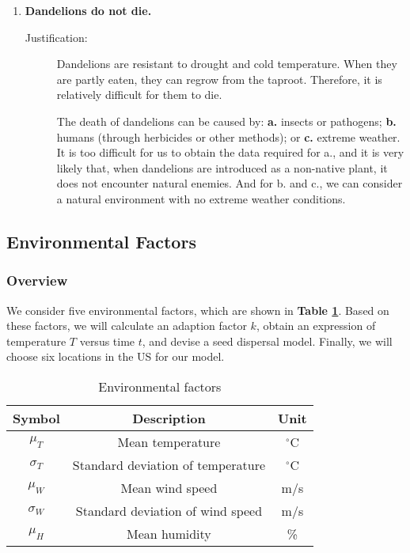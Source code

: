 \documentclass[12pt]{article}
\begin{document}
\begin{enumerate}
			\item \textbf{Dandelions do not die.}
			\vspace{-0.125in}
			\begin{description}
				\item[Justification:] Dandelions are resistant to drought and cold temperature.  When they are partly eaten, they can regrow from the taproot.  Therefore, it is relatively difficult for them to die.
				
				The death of dandelions can be caused by: \textbf{a.} insects or pathogens; \textbf{b.} humans (through herbicides or other methods); or \textbf{c.} extreme weather.  It is too difficult for us to obtain the data required for a., and it is very likely that, when dandelions are introduced as a non-native plant, it does not encounter natural enemies.  And for b. and c., we can consider a natural environment with no extreme weather conditions.  
			\end{description}
			
		\end{enumerate}
	
	
	
	
	
	\subsection{Environmental Factors}
	
		\subsubsection{Overview}
			
			We consider five environmental factors, which are shown in \textbf{Table \ref{tb:vars}}.  Based on these factors, we will calculate an adaption factor $k$, obtain an expression of temperature $T$ versus time $t$, and devise a seed dispersal model.  Finally, we will choose six locations in the US for our model.
			
			{
				\fontsize{10}{14}\selectfont
				{
					\begin{longtable}{ccc}
						\caption{Environmental factors}
						\label{tb:vars}\\
						\toprule
						Symbol&Description&Unit\\
						\toprule
						$\mu_T$&Mean temperature&$^\circ$C\\
						$\sigma_T$&Standard deviation of temperature&$^\circ$C\\
						$\mu_W$&Mean wind speed&m/s\\
						$\sigma_W$&Standard deviation of wind speed&m/s\\
						$\mu_H$&Mean humidity&\%\\
						\bottomrule
					\end{longtable}
				}
			}
			
\end{document}
